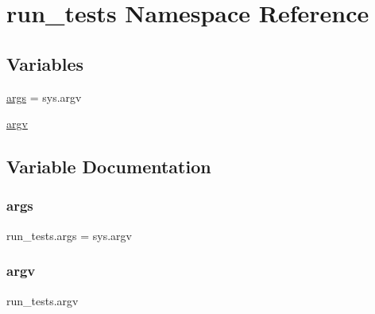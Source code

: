 \hypertarget{namespacerun__tests}{}\section{run\+\_\+tests Namespace Reference}
\label{namespacerun__tests}
\subsection*{Variables}
\begin{DoxyCompactItemize}
\item 
\mbox{\hyperlink{namespacerun__tests_a5b1510476d0793c7c91a6e0f733d7c29}{args}} = sys.\+argv
\item 
\mbox{\hyperlink{namespacerun__tests_a8a7b00d6f8aa6bda446535ba55c777fe}{argv}}
\end{DoxyCompactItemize}


\subsection{Variable Documentation}
\mbox{\label{namespacerun__tests_a5b1510476d0793c7c91a6e0f733d7c29}} 
\subsubsection{\texorpdfstring{args}{args}}
{\footnotesize\ttfamily run\+\_\+tests.\+args = sys.\+argv}

\mbox{\label{namespacerun__tests_a8a7b00d6f8aa6bda446535ba55c777fe}} 
\subsubsection{\texorpdfstring{argv}{argv}}
{\footnotesize\ttfamily run\+\_\+tests.\+argv}

